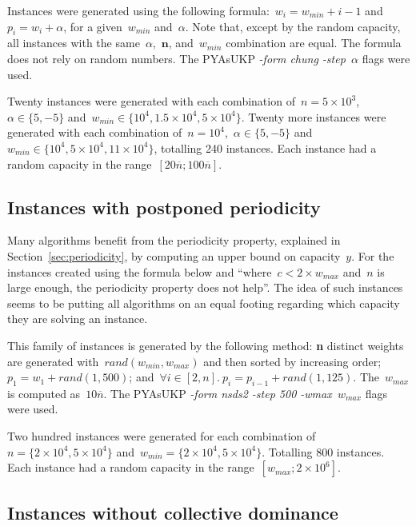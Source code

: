Instances were generated using the following formula:~\(w_i = w_{min} + i - 1\) and~\(p_i = w_i + \alpha\), for a given~\(w_{min}\) and~\(\alpha\).
Note that, except by the random capacity, all instances with the same~\(\alpha\),~\(\mathbf{n}\), and~\(w_{min}\) combination are equal.
The formula does not rely on random numbers.
The PYAsUKP \emph{-form chung -step~\(\alpha\)} flags were used.

Twenty instances were generated with each combination of~\(n = 5\times10^3\),~\(\alpha \in \{5, -5\}\) and~\(w_{min} \in \{10^4, 1.5\times10^4, 5\times10^4\}\).
Twenty more instances were generated with each combination of~\(n = 10^4\),~\(\alpha \in \{5, -5\}\) and~\(w_{min} \in \{10^4, 5\times10^4, 11\times10^4\}\), totalling 240 instances. Each instance had a random capacity in the range~\([20\overline{n}; 100\overline{n}]\).

\subsection{Instances with postponed periodicity}

Many algorithms benefit from the periodicity property, explained in Section~\ref{sec:periodicity}, by computing an upper bound on capacity~\(y\).
For the instances created using the formula below and ``where~\(c < 2 \times w_{max}\) and~\(n\) is large enough, the periodicity property does not help''\cite[p.~13]{pya}.
The idea of such instances seems to be putting all algorithms on an equal footing regarding which capacity they are solving an instance. 

This family of instances is generated by the following method: \textbf{n} distinct weights are generated with~\(rand(w_{min}, w_{max})\) and then sorted by increasing order;~\(p_1 = w_1 + rand(1, 500)\); and~\(\forall i \in [2, n].~p_i = p_{i-1} + rand(1, 125)\).
The~\(w_{max}\) is computed as~\(10\overline{n}\).
The PYAsUKP \emph{-form nsds2 -step 500 -wmax~\(w_{max}\)} flags were used.

Two hundred instances were generated for each combination of~\(n = \{2\times10^4, 5\times10^4\}\) and~\(w_{min} = \{2\times10^4, 5\times10^4\}\).
Totalling 800 instances.
Each instance had a random capacity in the range~\([w_{max}; 2\times10^6]\).

\subsection{Instances without collective dominance}

